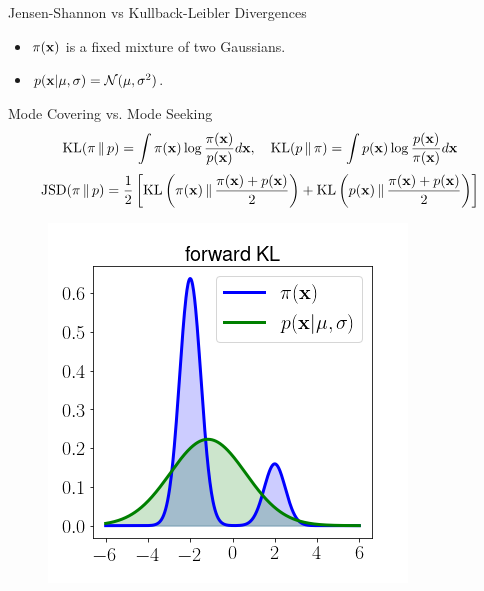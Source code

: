 \documentclass{beamer}
\begin{document}
\begin{frame}{Jensen-Shannon vs Kullback-Leibler Divergences}
	\begin{itemize}
		\item $\pi(\mathbf{x})$ is a fixed mixture of two Gaussians.
		\item $p(\mathbf{x} | \mu, \sigma) = \mathcal{N}(\mu, \sigma^2)$.
	\end{itemize}
	\begin{block}{Mode Covering vs. Mode Seeking}
		\vspace{-0.7cm}
		\[
		\mathrm{KL}(\pi \,\|\, p) = \int \pi(\mathbf{x}) \log \frac{\pi(\mathbf{x})}{p(\mathbf{x})}d\mathbf{x}, \quad \mathrm{KL}(p\,\|\,\pi) = \int p(\mathbf{x}) \log \frac{p(\mathbf{x})}{\pi(\mathbf{x})}d\mathbf{x}
		\]
		\[
		\mathrm{JSD}(\pi \,\|\, p) = \frac{1}{2} \left[\mathrm{KL} \left(\pi(\mathbf{x}) \,\|\, \frac{\pi(\mathbf{x}) + p(\mathbf{x})}{2}\right) + \mathrm{KL} \left(p(\mathbf{x}) \,\|\, \frac{\pi(\mathbf{x}) + p(\mathbf{x})}{2}\right) \right]
		\]
		\vspace{-0.7cm}
		\begin{minipage}[t]{0.33\columnwidth}
			\begin{figure}
				\includegraphics[width=\linewidth]{figs/forward_KL}
			\end{figure}
		\end{minipage}%
		\begin{minipage}[t]{0.33\columnwidth}
			\begin{figure}

\end{figure}
\end{minipage}
\end{block}
\end{frame}
\end{document}
